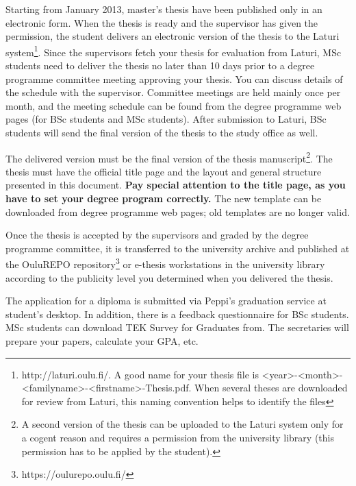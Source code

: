 Starting from January 2013, master’s thesis have been published only in an electronic form. When the thesis is ready and the supervisor has given the permission, the student delivers an electronic version of the thesis to the Laturi system\footnote{http://laturi.oulu.fi/. A good name for your thesis file is <year>-<month>-<familyname>-<firstname>-Thesis.pdf. When several theses are downloaded for review from Laturi, this naming convention helps to identify the files\DIFdelbegin {}\DIFdelend }. Since the supervisors fetch your thesis for evaluation from Laturi, MSc students need to deliver the thesis no later than 10 days prior to a degree programme committee meeting approving your thesis. You can discuss \DIFaddbegin {}\DIFaddend details of the schedule with the supervisor. Committee meetings are held mainly once per month, and the meeting schedule can be found from the degree programme web pages (for BSc students\DIFaddbegin \DIFadd{~}\DIFaddend \cite{bscstudies} and MSc students\DIFaddbegin \DIFadd{~}\DIFaddend \cite{mscstudies}). After submission to Laturi, BSc students will send the final version of the thesis to the study office as well.

The delivered version must be the final version of the thesis manuscript\footnote{A second version of the thesis can be uploaded to the Laturi system only for a cogent reason and requires a permission from the university library (this permission has to be applied by the student).}. The thesis must have the official title page and the layout and general structure presented in this document. \textbf{Pay special attention to the title page, as you have to set your degree program correctly.} The new template can be downloaded from degree programme web pages\DIFaddbegin \DIFadd{~}\DIFaddend \cite{mscstudies}; old templates are no longer valid.

Once the thesis is accepted by the supervisors and graded by the degree programme committee, it is transferred to the university archive and published at the OuluREPO repository\footnote{https://oulurepo.oulu.fi/} or e-thesis workstations in the university library according to the publicity level you determined when you delivered the thesis.

The application for a diploma is submitted via Peppi's graduation service at student's desktop. In addition, there is a feedback questionnaire for BSc students. MSc students can download TEK Survey for Graduates from\DIFaddbegin \DIFadd{~}\DIFaddend \cite{mscgraduation}. The secretaries will prepare your papers, calculate your GPA, etc. 

